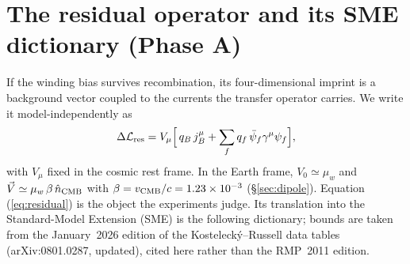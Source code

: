 
\section{The residual operator and its SME dictionary (Phase A)}
\label{sec:dictionary}

If the winding bias survives recombination, its four-dimensional imprint is a
background vector coupled to the currents the transfer operator carries. We
write it model-independently as
\begin{equation}
\Delta\mathcal{L}_{\rm res}
=
V_\mu\Big[\,q_B\,j_B^\mu+\sum_f q_f\,\bar\psi_f\gamma^\mu\psi_f\Big],
\label{eq:residual}
\end{equation}
with $V_\mu$ fixed in the cosmic rest frame. In the Earth frame,
$V_0\simeq\mu_w$ and $\vec V\simeq\mu_w\,\beta\,\hat n_{\rm CMB}$ with
$\beta=v_{\rm CMB}/c=1.23\times10^{-3}$ (\S\ref{sec:dipole}). Equation
(\ref{eq:residual}) is the object the experiments judge. Its translation into
the Standard-Model Extension (SME) is the following dictionary; bounds are
taken from the January~2026 edition of the Kosteleck\'y--Russell data tables
(arXiv:0801.0287, updated), cited here rather than the RMP~2011 edition.


